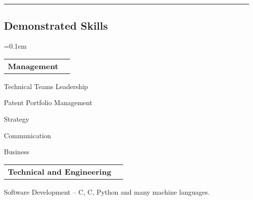\documentclass[10pt,letterpaper]{extarticle}
\makeatletter
\newenvironment{indentsection}[1]%
{\begin{list}{}%
	{\setlength{\leftmargin}{#1}}%
	\item[]%
}
{\end{list}}
\newcommand{\headerrow}[2]
{\begin{tabular*}{\linewidth}{l@{\extracolsep{\fill}}r}
	#1 &
	#2 \\
\end{tabular*}}
\newcommand{\CPP}
{C\nolinebreak[4]\hspace{-.05em}\raisebox{.22ex}{\footnotesize\bf ++}}
\makeatother
\begin{document}
\hrule
\vspace{-1em}\subsection*{\Large Demonstrated Skills}\vspace{-0.5em}
	\parskip=0.1em
\begin{flushleft} 

\vspace{0.2em}
\headerrow
{\large \textbf{Management}}{}\vspace{-0.7em}
\begin{indentsection}{-1em}\begin{itemize*}
		\item {Technical Teams Leadership}%
		\item {Patent Portfolio Management}%
                  \item {Strategy}%
                 \item {Communication}%
               \item {Business}%
\end{itemize*}\end{indentsection}
\headerrow
{\large \textbf{Technical and Engineering}}{}\vspace{-0.7em}
\begin{indentsection}{-1em}\begin{itemize*}
		\item {Software Development} -- C, \CPP, Python and many machine languages.%

\end{itemize*}
\end{indentsection}
\end{flushleft}
\end{document}
